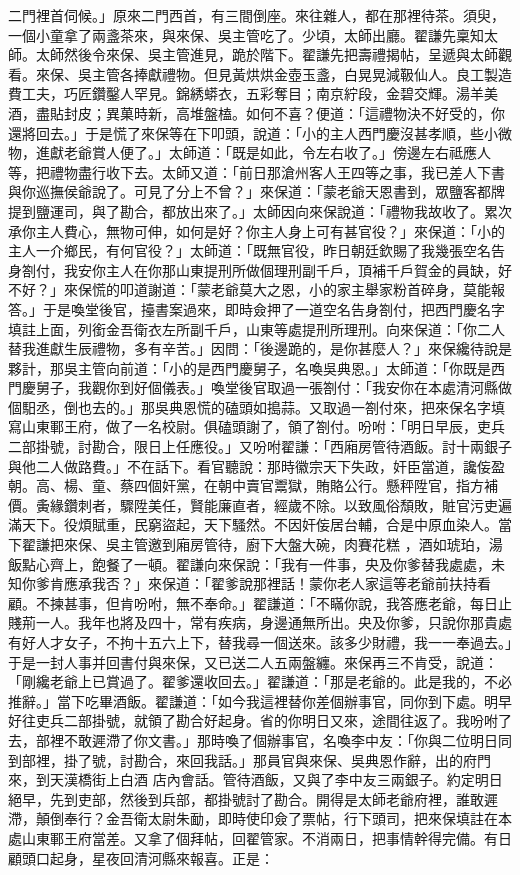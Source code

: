 \begin{showcontents}{}
二門裡首伺候。」原來二門西首，有三間倒座。來往雜人，都在那裡待茶。須臾，一個小童拿了兩盞茶來，與來保、吳主管吃了。少頃，太師出廳。翟謙先稟知太師。太師然後令來保、吳主管進見，跪於階下。翟謙先把壽禮揭帖，呈遞與太師觀看。來保、吳主管各捧獻禮物。但見黃烘烘金壺玉盞，白晃晃減靸仙人。良工製造費工夫，巧匠鑽鑿人罕見。錦綉蟒衣，五彩奪目；南京紵段，金碧交輝。湯羊美酒，盡貼封皮；異菓時新，高堆盤榼。如何不喜？便道：「這禮物決不好受的，你還將回去。」于是慌了來保等在下叩頭，說道：「小的主人西門慶沒甚孝順，些小微物，進獻老爺賞人便了。」太師道：「既是如此，令左右收了。」傍邊左右祗應人等，把禮物盡行收下去。太師又道：「前日那滄州客人王四等之事，我已差人下書與你巡撫侯爺說了。可見了分上不曾？」來保道：「蒙老爺天恩書到，眾鹽客都牌提到鹽運司，與了勘合，都放出來了。」太師因向來保說道：「禮物我故收了。累次承你主人費心，無物可伸，如何是好？你主人身上可有甚官役？」來保道：「小的主人一介鄉民，有何官役？」太師道：「既無官役，昨日朝廷欽賜了我幾張空名告身劄付，我安你主人在你那山東提刑所做個理刑副千戶，頂補千戶賀金的員缺，好不好？」來保慌的叩道謝道：「蒙老爺莫大之恩，小的家主舉家粉首碎身，莫能報答。」于是喚堂後官，擡書案過來，即時僉押了一道空名告身劄付，把西門慶名字填註上面，列銜金吾衛衣左所副千戶，山東等處提刑所理刑。向來保道：「你二人替我進獻生辰禮物，多有辛苦。」因問：「後邊跪的，是你甚麼人？」來保纔待說是夥計，那吳主管向前道：「小的是西門慶舅子，名喚吳典恩。」太師道：「你既是西門慶舅子，我觀你到好個儀表。」喚堂後官取過一張劄付：「我安你在本處清河縣做個馹丞，倒也去的。」那吳典恩慌的磕頭如搗蒜。又取過一劄付來，把來保名字填寫山東鄆王府，做了一名校尉。俱磕頭謝了，領了劄付。吩咐：「明日早辰，吏兵二部掛號，討勘合，限日上任應役。」又吩咐翟謙：「西廂房管待酒飯。討十兩銀子與他二人做路費。」不在話下。看官聽說：那時徽宗天下失政，奸臣當道，讒侫盈朝。高、楊、童、蔡四個奸黨，在朝中賣官鬻獄，賄賂公行。懸秤陞官，指方補價。夤緣鑽刺者，驟陞美任，賢能廉直者，經歲不除。以致風俗頹敗，賍官污吏遍滿天下。役煩賦重，民窮盜起，天下騷然。不因奸侫居台輔，合是中原血染人。當下翟謙把來保、吳主管邀到廂房管待，廚下大盤大碗，肉賽花糕 ，酒如琥珀，湯飯點心齊上，飽餐了一頓。翟謙向來保說：「我有一件事，央及你爹替我處處，未知你爹肯應承我否？」來保道：「翟爹說那裡話！蒙你老人家這等老爺前扶持看顧。不揀甚事，但肯吩咐，無不奉命。」翟謙道：「不瞞你說，我答應老爺，每日止賤荊一人。我年也將及四十，常有疾病，身邊通無所出。央及你爹，只說你那貴處有好人才女子，不拘十五六上下，替我尋一個送來。該多少財禮，我一一奉過去。」于是一封人事并回書付與來保，又已送二人五兩盤纏。來保再三不肯受，說道：「剛纔老爺上已賞過了。翟爹還收回去。」翟謙道：「那是老爺的。此是我的，不必推辭。」當下吃畢酒飯。翟謙道：「如今我這裡替你差個辦事官，同你到下處。明早好往吏兵二部掛號，就領了勘合好起身。省的你明日又來，途間往返了。我吩咐了去，部裡不敢遲滯了你文書。」那時喚了個辦事官，名喚李中友：「你與二位明日同到部裡，掛了號，討勘合，來回我話。」那員官與來保、吳典恩作辭，出的府門來，到天漢橋街上白酒 店內會話。管待酒飯，又與了李中友三兩銀子。約定明日絕早，先到吏部，然後到兵部，都掛號討了勘合。開得是太師老爺府裡，誰敢遲滯，顛倒奉行？金吾衛太尉朱勔，即時使印僉了票帖，行下頭司，把來保填註在本處山東鄆王府當差。又拿了個拜帖，回翟管家。不消兩日，把事情幹得完備。有日顧頭口起身，星夜回清河縣來報喜。正是：


\end{showcontents}
